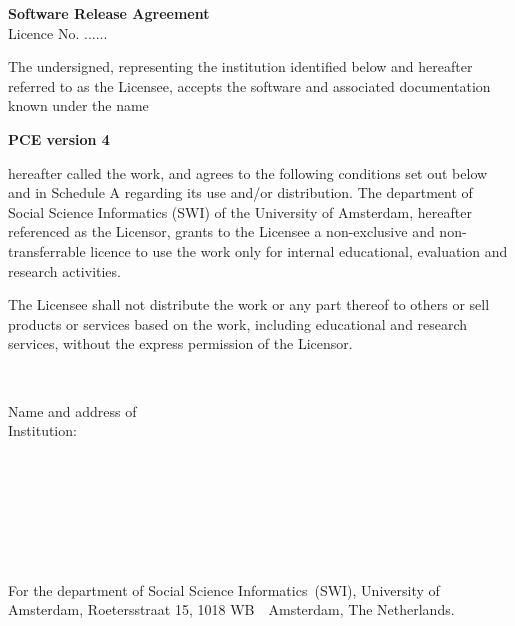 \setlength{\parindent}{0in}
\setlength{\parskip}{5pt}
\nofiles

\begin{center}
    { \Large \bf Software Release Agreement } \\
    \vspace{1cm}
    { Licence No. ...... }
    \vspace{1.5cm}
\end{center}

The undersigned, representing the institution identified below and
hereafter referred to as the Licensee, accepts the software and
associated documentation known under the name

\vspace{5mm}
\centerline{\Large \bf PCE version 4}
\vspace{5mm}

hereafter called the work, and agrees to the following conditions set
out below and in Schedule A regarding its use and/or distribution. The
department of Social Science Informatics (SWI) of the University of
Amsterdam, hereafter referenced as the Licensor, grants to the Licensee
a non-exclusive and non-transferrable licence to use the work only for
internal educational, evaluation and research activities.

The Licensee shall not distribute the work or any part thereof to
others or sell products or services based on the work, including
educational and research services, without the express permission of the
Licensor.

\newlength{\tag}
\settowidth{\tag}{Authorised Signature: }
\newlength{\rest}
\setlength{\rest}{\textwidth}
\addtolength{\rest}{-\tag}

\newcommand{\fillin}{\dotfill\mbox{}}
\newcommand{\onlydots}{\mbox{}\fillin}
\newcommand{\next}{\\[7mm]}

\vspace{1cm}
\fillin \next
\parbox[t]{\tag}{Name and address of \\ Institution:}%
\parbox[t]{\rest}{\onlydots \next \onlydots \next \onlydots} \next
{}\fillin \next
{}\fillin \next
\vspace{0.5cm}

For the department of Social Science Informatics~(SWI), University of
Amsterdam, Roetersstraat 15, 1018 WB~~Amsterdam, The Netherlands. 
\vspace{1cm}

